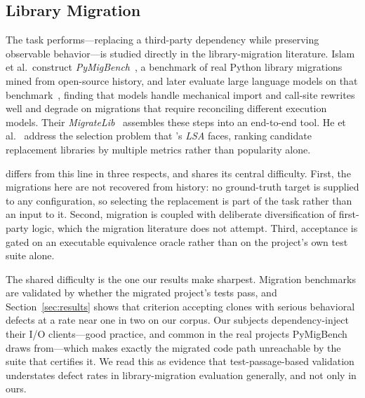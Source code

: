 
\subsection{Library Migration}

The task \sys performs---replacing a third-party dependency while preserving
observable behavior---is studied directly in the library-migration literature.
Islam et al.\ construct \emph{PyMigBench}~\cite{islam2023pymigbench}, a
benchmark of real Python library migrations mined from open-source history,
and later evaluate large language models on that benchmark~\cite{islam2025llmmigration},
finding that models handle mechanical import and call-site rewrites well and
degrade on migrations that require reconciling different execution models. Their
\emph{MigrateLib}~\cite{islam2025migratelib} assembles these steps into an
end-to-end tool. He et al.~\cite{he2021ranking} address the selection problem
that \sys's \emph{LSA} faces, ranking candidate replacement libraries by
multiple metrics rather than popularity alone.

\sys differs from this line in three respects, and shares its central
difficulty. First, the migrations here are not recovered from history: no
ground-truth target is supplied to any configuration, so selecting the
replacement is part of the task rather than an input to it. Second, migration
is coupled with deliberate diversification of first-party logic, which the
migration literature does not attempt. Third, acceptance is gated on an
executable equivalence oracle rather than on the project's own test suite
alone.

The shared difficulty is the one our results make sharpest. Migration
benchmarks are validated by whether the migrated project's tests pass, and
Section~\ref{sec:results} shows that criterion accepting clones with serious
behavioral defects at a rate near one in two on our corpus. Our subjects
dependency-inject their I/O clients---good practice, and common in the
real projects PyMigBench draws from---which makes exactly the migrated code
path unreachable by the suite that certifies it. We read this as evidence that
test-passage-based validation understates defect rates in library-migration
evaluation generally, and not only in ours.

